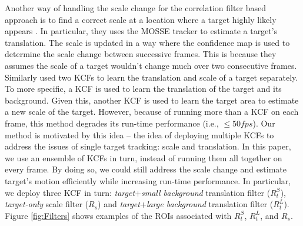 \documentclass{bmvc2k}
\begin{document}
Another way of handling the scale change for the correlation filter
based approach is to find a correct scale at a location where a target
highly likely appears \cite{zhang2014fast}. In particular, they uses
the MOSSE tracker to estimate a target's translation. The scale is
updated in a way where the confidence map is used to determine the
scale change between successive frames. This is because they assumes
the scale of a target wouldn't change much over two consecutive
frames. Similarly \cite{ma2015long} used two KCFs to learn the
translation and scale of a target separately. To more specific, a KCF
is used to learn the translation of the target and its
background. Given this, another KCF is used to learn the target area
to estimate a new scale of the target. However, because of running
more than a KCF on each frame, this method degrades its run-time
performance (i.e., $\leq 50 fps$). Our method is motivated by this
idea -- the idea of deploying multiple KCFs to address the issues of
single target tracking: scale and translation. In this paper, we use
an ensemble of KCFs in turn, instead of running them all together on
every frame. By doing so, we could still address the scale change and
estimate target's motion efficiently while increasing run-time
performance. In particular, we deploy three KCF in turn:
\textit{target}+\textit{small background} translation filter
($R_{t}^{S}$), \textit{target-only} scale filter ($R_{s}$) and
\textit{target}+\textit{large background} translation filter
($R_{t}^{L}$). Figure \ref{fig:Filters} shows examples of the ROIs
associated with $R_{t}^{S}$, $R_{t}^{L}$, and $R_{s}$.

\end{document}
